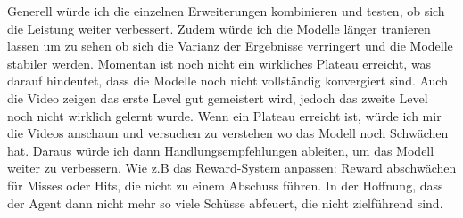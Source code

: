\documentclass{article}
\begin{document}
Generell würde ich die einzelnen Erweiterungen kombinieren und testen, ob sich die Leistung weiter verbessert. 
Zudem würde ich die Modelle länger tranieren lassen um zu sehen ob sich die Varianz der Ergebnisse verringert und die Modelle stabiler werden. Momentan ist noch nicht ein wirkliches Plateau erreicht, was darauf hindeutet, dass die Modelle noch nicht vollständig konvergiert sind.
Auch die Video zeigen das erste Level gut gemeistert wird, jedoch das zweite Level noch nicht wirklich gelernt wurde.
Wenn ein Plateau erreicht ist, würde ich mir die Videos anschaun und versuchen zu verstehen wo das Modell noch Schwächen hat. Daraus würde ich dann Handlungsempfehlungen ableiten, um das Modell weiter zu verbessern.
Wie z.B das Reward-System anpassen: Reward abschwächen für Misses oder Hits, die nicht zu einem Abschuss führen. In der Hoffnung, dass der Agent dann nicht mehr so viele Schüsse abfeuert, die nicht zielführend sind.
\end{document}
